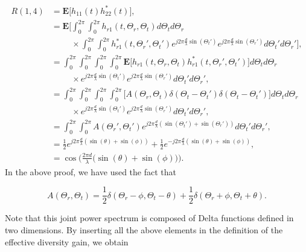 \documentclass [a4paper, 11pt] {article}
\begin{document}
\begin{solution}
\begin{enumerate}
\begin{itemize}
        \begin{align}
        R(1,4) &= \mathbf{E}\Big[h_{11}(t)h_{22}^*(t) \Big], \\
        &= \mathbf{E}\Bigg[\int_{0}^{2\pi} \int_{0}^{2\pi}h_{r1}(t,\Theta_r,\Theta_t) d\Theta_t d\Theta_r \nonumber\\
        &\hspace{1cm}\times \int_{0}^{2\pi} \int_{0}^{2\pi}h_{r1}^*(t,\Theta_r',\Theta_t')e^{j2\pi\frac{d}{\lambda}\sin(\Theta_t')}e^{j2\pi\frac{d}{\lambda}\sin(\Theta_r')} d\Theta_t' d\Theta_r'\Bigg] ,\\
        &= \int_{0}^{2\pi} \int_{0}^{2\pi}\int_{0}^{2\pi} \int_{0}^{2\pi} \mathbf{E}\Big[h_{r1}(t,\Theta_r,\Theta_t)h_{r1}^*(t,\Theta_r',\Theta_t')\Big] d\Theta_t d\Theta_r \nonumber \\
        &\hspace{1cm}\times e^{j2\pi\frac{d}{\lambda}\sin(\Theta_t')} e^{j2\pi\frac{d}{\lambda}\sin(\Theta_r')} d\Theta_t' d\Theta_r' ,\\
        &= \int_{0}^{2\pi} \int_{0}^{2\pi}\int_{0}^{2\pi} \int_{0}^{2\pi}  \Big[A(\Theta_r,\Theta_t)\delta(\Theta_t - \Theta_t') \delta(\Theta_t - \Theta_t')\Big] d\Theta_t d\Theta_r \nonumber \\
        &\hspace{1cm}\times e^{j2\pi\frac{d}{\lambda}\sin(\Theta_t')} e^{j2\pi\frac{d}{\lambda}\sin(\Theta_r')} d\Theta_t' d\Theta_r', \\
        &= \int_{0}^{2\pi} \int_{0}^{2\pi} A(\Theta_r',\Theta_t')  e^{j2\pi\frac{d}{\lambda}(\sin(\Theta_t')+\sin(\Theta_r'))} d\Theta_t' d\Theta_r', \\
        &= \frac{1}{2}e^{j2\pi\frac{d}{\lambda}(\sin(\theta)+\sin(\phi))} 
        + \frac{1}{2}e^{-j2\pi\frac{d}{\lambda}(\sin(\theta)+\sin(\phi))}, \\
        &= \cos \bigg( \frac{2 \pi d}{\lambda} \big(\sin (\theta) +\sin (\phi)\big)\bigg).
    \end{align}
    In the above proof, we have used the fact that 
    
    \begin{equation}
        A(\Theta_r,\Theta_t) = \frac{1}{2} \delta(\Theta_r - \phi,\Theta_t - \theta)+ \frac{1}{2} \delta(\Theta_r + \phi,\Theta_t + \theta).
    \end{equation}
    
    Note that this joint power spectrum is composed of Delta functions defined in two dimensions. By inserting all the above elements in the definition of the effective diversity gain, we obtain
    

\end{itemize}
\end{enumerate}
\end{solution}
\end{document}
